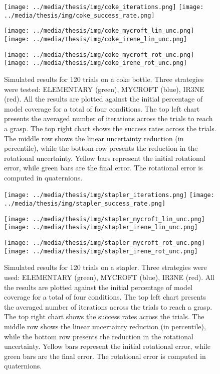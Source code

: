 \begin{figure}[!h]
\centerline{
\texttt{[image: ../media/thesis/img/coke\_iterations.png]}
\texttt{[image: ../media/thesis/img/coke\_success\_rate.png]}
}
\centerline{
\texttt{[image: ../media/thesis/img/coke\_mycroft\_lin\_unc.png]}
\texttt{[image: ../media/thesis/img/coke\_irene\_lin\_unc.png]}
}
\centerline{
\texttt{[image: ../media/thesis/img/coke\_mycroft\_rot\_unc.png]}
\texttt{[image: ../media/thesis/img/coke\_irene\_rot\_unc.png]}
}

\caption[Simulated results on a coke bottle]{Simulated results for 120 trials on a coke bottle. Three strategies were tested: ELEMENTARY (green), MYCROFT (blue), IR3NE (red). All the results are plotted against the initial percentage of model coverage for a total of four conditions. The top left chart presents the averaged number of iterations across the trials to reach a grasp. The top right chart shows the success rates across the trials. The middle row shows the linear uncertainty reduction (in percentile), while the bottom row presents the reduction in the rotational uncertainty. Yellow bars represent the initial rotational error, while green bars are the final error. The rotational error is computed in quaternions.}
\label{fig:07:coke_results}
\end{figure}

\begin{figure}[!ht]
\centerline{
\texttt{[image: ../media/thesis/img/stapler\_iterations.png]}
\texttt{[image: ../media/thesis/img/stapler\_success\_rate.png]}
}
\centerline{
\texttt{[image: ../media/thesis/img/stapler\_mycroft\_lin\_unc.png]}
\texttt{[image: ../media/thesis/img/stapler\_irene\_lin\_unc.png]}
}
\centerline{
\texttt{[image: ../media/thesis/img/stapler\_mycroft\_rot\_unc.png]}
\texttt{[image: ../media/thesis/img/stapler\_irene\_rot\_unc.png]}
}

\caption[Simulated results on a stapler]{Simulated results for 120 trials on a stapler. Three strategies were used: ELEMENTARY (green), MYCROFT (blue), IR3NE (red). All the results are plotted against the initial percentage of model coverage for a total of four conditions. The top left chart presents the averaged number of iterations across the trials to reach a grasp. The top right chart shows the success rates across the trials. The middle row shows the linear uncertainty reduction (in percentile), while the bottom row presents the reduction in the rotational uncertainty. Yellow bars represent the initial rotational error, while green bars are the final error. The rotational error is computed in quaternions.}
\label{fig:07:stapler_results}
\end{figure}

